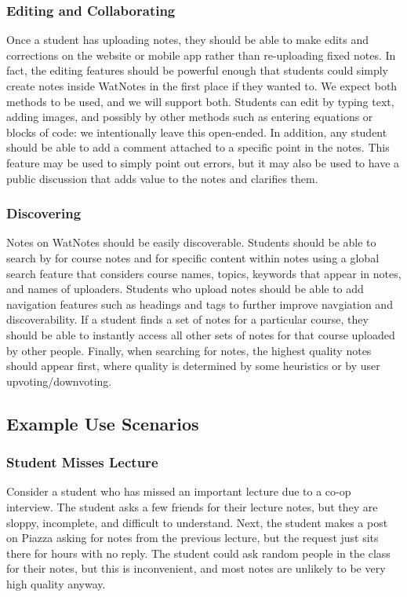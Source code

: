 \documentclass[12pt]{article}
\begin{document}
  \subsubsection{Editing and Collaborating}
  Once a student has uploading notes, they should be able to make edits and corrections on the website or mobile app rather than re-uploading fixed notes. In fact, the editing features should be powerful enough that students could simply create notes inside WatNotes in the first place if they wanted to. We expect both methods to be used, and we will support both. Students can edit by typing text, adding images, and possibly by other methods such as entering equations or blocks of code: we intentionally leave this open-ended. In addition, any student should be able to add a comment attached to a specific point in the notes. This feature may be used to simply point out errors, but it may also be used to have a public discussion that adds value to the notes and clarifies them.
  \subsubsection{Discovering}
  Notes on WatNotes should be easily discoverable. Students should be able to search by for course notes and for specific content within notes using a global search feature that considers course names, topics, keywords that appear in notes, and names of uploaders. Students who upload notes should be able to add navigation features such as headings and tags to further improve navgiation and discoverability. If a student finds a set of notes for a particular course, they should be able to instantly access all other sets of notes for that course uploaded by other people. Finally, when searching for notes, the highest quality notes should appear first, where quality is determined by some heuristics or by user upvoting/downvoting.
\subsection{Example Use Scenarios}
  \subsubsection{Student Misses Lecture}
  Consider a student who has missed an important lecture due to a co-op interview. The student asks a few friends for their lecture notes, but they are sloppy, incomplete, and difficult to understand. Next, the student makes a post on Piazza asking for notes from the previous lecture, but the request just sits there for hours with no reply. The student could ask random people in the class for their notes, but this  is inconvenient, and most notes are unlikely to be very high quality anyway. \\
\end{document}
